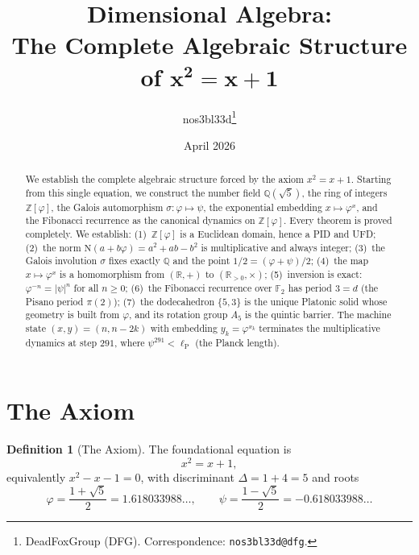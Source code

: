\documentclass[11pt,a4paper]{article}
\theoremstyle{plain}
\theoremstyle{definition}
\newtheorem{definition}[theorem]{Definition}
\newcommand{\R}{\mathbb{R}}
\newcommand{\Z}{\mathbb{Z}}
\newcommand{\Q}{\mathbb{Q}}
\newcommand{\F}{\mathbb{F}}
\newcommand{\vp}{\varphi}
\newcommand{\ps}{\psi}
\newcommand{\Norm}{\mathrm{N}}
\begin{document}
\title{%
  \textbf{Dimensional Algebra:}\\[4pt]
  \textbf{The Complete Algebraic Structure of $\boldsymbol{x^{2} = x + 1}$}%
}
\author{%
  nos3bl33d\thanks{%
    DeadFoxGroup (DFG). Correspondence: \texttt{nos3bl33d@dfg}.%
  }%
}
\date{April 2026}

\maketitle

\begin{abstract}
We establish the complete algebraic structure forced by the axiom
$x^{2} = x + 1$.  Starting from this single equation, we construct
the number field $\Q(\sqrt{5})$, the ring of integers $\Z[\vp]$,
the Galois automorphism $\sigma : \vp \mapsto \ps$, the
exponential embedding $x \mapsto \vp^{x}$, and the Fibonacci
recurrence as the canonical dynamics on $\Z[\vp]$.  Every theorem
is proved completely.  We establish:
(1)~$\Z[\vp]$ is a Euclidean domain, hence a PID and UFD;
(2)~the norm $\Norm(a + b\vp) = a^{2} + ab - b^{2}$ is multiplicative
and always integer;
(3)~the Galois involution $\sigma$ fixes exactly $\Q$ and the
point $1/2 = (\vp + \ps)/2$;
(4)~the map $x \mapsto \vp^{x}$ is a homomorphism from $(\R, +)$
to $(\R_{>0}, \times)$;
(5)~inversion is exact: $\vp^{-n} = |\ps|^{n}$ for all $n \ge 0$;
(6)~the Fibonacci recurrence over $\F_{2}$ has period $3 = d$
(the Pisano period $\pi(2)$);
(7)~the dodecahedron $\{5,3\}$ is the unique Platonic solid whose
geometry is built from $\vp$, and its rotation group $A_{5}$ is
the quintic barrier.
The machine state $(x, y) = (n, n - 2k)$ with embedding $y_{k} = \vp^{x_{k}}$
terminates the multiplicative dynamics at step $291$, where
$\ps^{291} < \ell_{\mathrm{P}}$ (the Planck length).
\end{abstract}

\tableofcontents

\section{The Axiom}\label{sec:axiom}

\begin{definition}[The Axiom]\label{def:axiom}
The foundational equation is
\begin{equation}\label{eq:axiom}
  x^{2} = x + 1,
\end{equation}
equivalently $x^{2} - x - 1 = 0$, with discriminant
$\Delta = 1 + 4 = 5$ and roots
\begin{equation}\label{eq:roots}
  \vp = \frac{1 + \sqrt{5}}{2} = 1.618033988\ldots, \qquad
  \ps = \frac{1 - \sqrt{5}}{2} = -0.618033988\ldots
\end{equation}
\end{definition}
\end{document}
